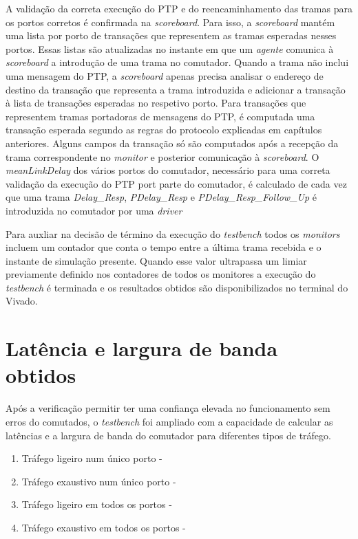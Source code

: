 A validação da correta execução do PTP e do reencaminhamento das tramas para os portos corretos é confirmada na \textit{scoreboard}. Para isso, a \textit{scoreboard} mantém uma lista por porto de transações que representem as tramas esperadas nesses portos. Essas listas são atualizadas no instante em que um \textit{agente} comunica à \textit{scoreboard} a introdução de uma trama no comutador.  Quando a trama não inclui uma mensagem do PTP, a \textit{scoreboard} apenas precisa analisar o endereço de destino da transação que representa a trama introduzida e adicionar a transação à lista de transações esperadas no respetivo porto. Para transações que representem tramas portadoras de mensagens do PTP, é computada uma transação esperada segundo as regras do protocolo explicadas em capítulos anteriores. Alguns campos da transação só são computados após a recepção da trama correspondente no \textit{monitor} e posterior comunicação à \textit{scoreboard}. O \textit{meanLinkDelay} dos vários portos do comutador, necessário para uma correta validação da execução do PTP port parte do comutador, é calculado de cada vez que uma trama \textit{Delay\_Resp}, \textit{PDelay\_Resp} e \textit{PDelay\_Resp\_Follow\_Up} é introduzida no comutador por uma \textit{driver}  \par
Para auxliar na decisão de término da execução do \textit{testbench} todos os \textit{monitors} incluem um contador que conta o tempo entre a última trama recebida e o instante de simulação presente. Quando esse valor ultrapassa um limiar previamente definido nos contadores de todos os monitores a execução do \textit{testbench} é terminada e os resultados obtidos são disponibilizados no terminal do Vivado.


\section{Latência e largura de banda obtidos}


Após a verificação permitir ter uma confiança elevada no funcionamento sem erros do comutados, o \textit{testbench} foi ampliado com a capacidade de calcular as latências e a largura de banda do comutador para diferentes tipos de tráfego. 

\begin{enumerate}
\item Tráfego ligeiro num único porto -\quad 
\item Tráfego exaustivo num único porto -\quad 
\item Tráfego ligeiro em todos os portos -\quad 
\item Tráfego exaustivo em todos os portos -\quad 
\end{enumerate}


